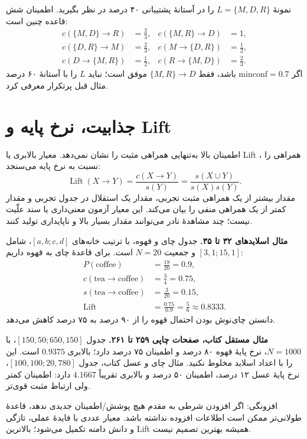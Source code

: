 \documentclass[12pt,a4paper,oneside]{report}
\newcounter{ex}[chapter]
\begin{document}
نمونهٔ $L=\{M,D,R\}$ را در آستانهٔ پشتیبانی ۴۰ درصد در نظر بگیرید. اطمینان شش قاعده چنین است:
\begin{align*}
c(\{M,D\}\to R)&=\frac23,& c(\{M,R\}\to D)&=1,\\
c(\{D,R\}\to M)&=\frac23,& c(M\to\{D,R\})&=\frac12,\\
c(D\to\{M,R\})&=\frac12,& c(R\to\{M,D\})&=\frac23.
\end{align*}
اگر $\mathrm{minconf}=0.7$ باشد، فقط $\{M,R\}\to D$ موفق است؛ نباید $L$ را با آستانهٔ ۶۰ درصد مثال قبل پرتکرار معرفی کرد.

\section{جذابیت، نرخ پایه و Lift}

اطمینان بالا به‌تنهایی همراهی مثبت را نشان نمی‌دهد. معیار بالابری یا Lift ، همراهی را نسبت به نرخ پایه می‌سنجد:
\[\operatorname{Lift}(X\to Y)=\frac{c(X\to Y)}{s(Y)}=\frac{s(X\cup Y)}{s(X)s(Y)}.\]
مقدار بیشتر از یک همراهی مثبت تجربی، مقدار یک استقلال در جدول تجربی و مقدار کمتر از یک همراهی منفی را بیان می‌کند. این معیار آزمون معنی‌داری یا سند علّیت نیست؛ چند مشاهدهٔ نادر می‌توانند مقدار بسیار بالا و ناپایداری تولید کنند.

\textbf{مثال اسلایدهای ۳۲ تا ۳۵.} جدول چای و قهوه، با ترتیب خانه‌های $[a,b;c,d]$، شامل $[3,1;15,1]$ و جمعیت $N=20$ است. برای قاعدهٔ چای به قهوه داریم:
\begin{align*}
P(\mathrm{coffee})&=\frac{18}{20}=0.9,\\
c(\mathrm{tea}\to\mathrm{coffee})&=\frac34=0.75,\\
s(\mathrm{tea}\to\mathrm{coffee})&=\frac3{20}=0.15,\\
\operatorname{Lift}&=\frac{0.75}{0.9}=\frac56\approx0.8333.
\end{align*}
دانستن چای‌نوش بودن احتمال قهوه را از ۹۰ درصد به ۷۵ درصد کاهش می‌دهد.

\textbf{مثال مستقل کتاب، صفحات چاپی ۲۵۹ تا ۲۶۱.} جدول $[150,50;650,150]$، با $N=1000$، نرخ پایهٔ قهوه ۸۰ درصد و اطمینان ۷۵ درصد دارد؛ بالابری $0.9375$ است. این را با اعداد اسلاید مخلوط نکنید. مثال چای و عسل کتاب، جدول $[100,100;20,780]$، نرخ پایهٔ عسل ۱۲ درصد، اطمینان ۵۰ درصد و بالابری تقریباً $4.1667$ دارد: اطمینان کمتر ولی ارتباط مثبت قوی‌تر.

افزونگی: اگر افزودن شرطی به مقدم هیچ پوشش/اطمینان جدیدی ندهد، قاعدهٔ طولانی‌تر ممکن است اطلاعات افزوده نداشته باشد. معیار عددی با فایدهٔ عملی، تازگی و دانش دامنه تکمیل می‌شود؛ بالاترین Lift همیشه بهترین تصمیم نیست.
\end{document}
